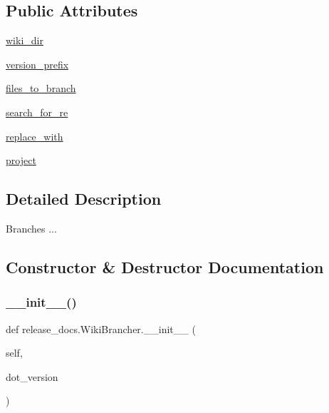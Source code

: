 \subsection*{Public Attributes}
\begin{DoxyCompactItemize}
\item 
\hyperlink{classrelease__docs_1_1_wiki_brancher_ad86478c9538ac0bf3916f67eb5da2910}{wiki\+\_\+dir}
\item 
\hyperlink{classrelease__docs_1_1_wiki_brancher_aae330aeef850b105795c5d75727448ba}{version\+\_\+prefix}
\item 
\hyperlink{classrelease__docs_1_1_wiki_brancher_a938c78ba6e8adfb6af039dd500ac6466}{files\+\_\+to\+\_\+branch}
\item 
\hyperlink{classrelease__docs_1_1_wiki_brancher_a029ce9007fefd6ac5f13bacdedb29af5}{search\+\_\+for\+\_\+re}
\item 
\hyperlink{classrelease__docs_1_1_wiki_brancher_aa33d991e629cc94fbfefe4f8569e283e}{replace\+\_\+with}
\item 
\hyperlink{classrelease__docs_1_1_wiki_brancher_a4ac9c796f95690cca04049b557055443}{project}
\end{DoxyCompactItemize}


\subsection{Detailed Description}
\begin{DoxyVerb}Branches ...\end{DoxyVerb}
 

\subsection{Constructor \& Destructor Documentation}
\mbox{\label{classrelease__docs_1_1_wiki_brancher_a344b32e2b65f0e8bab9fbf1e670d33fd}} 
\subsubsection{\texorpdfstring{\+\_\+\+\_\+init\+\_\+\+\_\+()}{\_\_init\_\_()}}
{\footnotesize\ttfamily def release\+\_\+docs.\+Wiki\+Brancher.\+\_\+\+\_\+init\+\_\+\+\_\+ (\begin{DoxyParamCaption}\item[{}]{self,  }\item[{}]{dot\+\_\+version }\end{DoxyParamCaption})}



